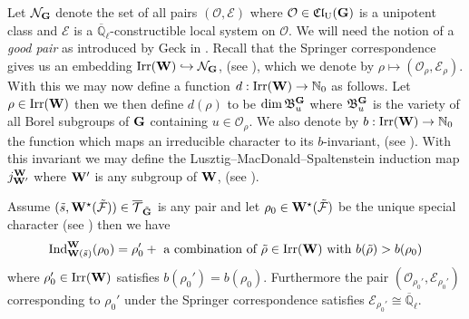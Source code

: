 \documentclass[eqthmnum]{jt-calcs}
\newcommand{\Clu}{\ensuremath{\mathfrak{Cl}_{\mathrm{U}}}}
\newcommand{\Ql}{\ensuremath{\overline{\mathbb{Q}}_{\ell}}}
\begin{document}
\begin{pa}
Let $\mathcal{N}_{\mathbf{G}}$ denote the set of all pairs $(\mathcal{O},\mathscr{E})$ where $\mathcal{O} \in \Clu(\bG)$ is a unipotent class and $\mathscr{E}$ is a $\Ql$-constructible local system on $\mathcal{O}$. We will need the notion of a \emph{good pair} as introduced by Geck in \cite[4.4]{geck:1999:character-sheaves-and-GGGRs}. Recall that the Springer correspondence gives us an embedding $\operatorname{Irr}(\mathbf{W}) \hookrightarrow \mathcal{N}_{\mathbf{G}}$, (see \cite{lusztig:1984:intersection-cohomology-complexes}), which we denote by $\rho \mapsto (\mathcal{O}_{\rho},\mathscr{E}_{\rho})$. With this we may now define a function $d : \operatorname{Irr}(\mathbf{W}) \to \mathbb{N}_0$ as follows. Let $\rho \in \operatorname{Irr}(\mathbf{W})$ then we then define $d(\rho)$ to be $\dim\mathfrak{B}_u^{\mathbf{G}}$ where $\mathfrak{B}_u^{\mathbf{G}}$ is the variety of all Borel subgroups of $\mathbf{G}$ containing $u \in \mathcal{O}_{\rho}$. We also denote by $b : \operatorname{Irr}(\mathbf{W}) \to \mathbb{N}_0$ the function which maps an irreducible character to its $b$-invariant, (see \cite[\S5.2.2]{geck-pfeiffer:2000:characters-of-finite-coxeter-groups}). With this invariant we may define the Lusztig--MacDonald--Spaltenstein induction map $j_{\mathbf{W}'}^{\mathbf{W}}$ where $\mathbf{W}'$ is any subgroup of $\mathbf{W}$, (see \cite[\S5.2.8]{geck-pfeiffer:2000:characters-of-finite-coxeter-groups}).
\end{pa}

\begin{prop}\label{prop:lusztig-j-ind}
Assume $(\tilde{s},\mathbf{W}^{\star}(\tilde{\mathcal{F}})) \in \overline{\mathcal{T}}_{\tilde{\mathbf{G}}}$ is any pair and let $\rho_0 \in \mathbf{W}^{\star}(\tilde{\mathcal{F}})$ be the unique special character (see \cite[Theorem 6.5.13(b)]{geck-pfeiffer:2000:characters-of-finite-coxeter-groups}) then we have
\begin{equation*}
\operatorname{Ind}_{\mathbf{W}(\tilde{s})}^{\mathbf{W}}(\rho_0) = \rho_0' + \text{ a combination of }\tilde{\rho} \in \operatorname{Irr}(\mathbf{W}) \text{ with }b(\tilde{\rho})> b(\rho_0)
\end{equation*}
where $\rho_0' \in \operatorname{Irr}(\mathbf{W})$ satisfies $b(\rho_0') = b(\rho_0)$. Furthermore the pair $(\mathcal{O}_{\rho_0'},\mathscr{E}_{\rho_0'})$ corresponding to $\rho_0'$ under the Springer correspondence satisfies $\mathscr{E}_{\rho_0'} \cong \Ql$.
\end{prop}
\end{document}
